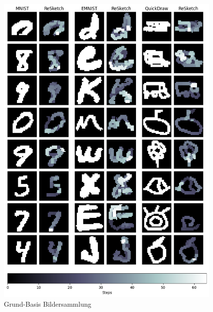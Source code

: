 \begin{figure}[!ht]
    \centering
    \includegraphics[width=\textwidth]{images/resultate/base-base.png}
    \caption{Grund-Basis Bildersammlung}\label{fig:Grund-Basis}
\end{figure}

